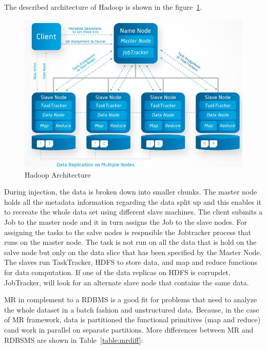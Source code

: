 The described architecture of Hadoop is shown in the \mbox{figure \ref{hdfs_arch}}.

\begin{figure}[!ht]
\centering
\includegraphics[width=15cm]{hdfs_architecture}
\caption{Hadoop Architecture\cite{hdfsFigure}}\label{hdfs_arch}
\end{figure}

During injection, the data is broken down into smaller chunks. The master node holds all the metadata information regarding the data split up and this enables it to recreate the whole data set using different slave machines.\cite{blog} The client submits a Job to the master node and it in turn assigns the Job to the slave nodes. For assigning the tasks to the salve nodes is respnsible the Jobtracker process that runs on the master node. The task is not run on all the data that is hold on the salve node but only on the data slice that has been specified by the Master Node. The slaves run TaskTracker, HDFS to store data, and map and reduce functions for data computation.\cite{rosebt} If one of the data replicas on HDFS is corrupdet, JobTracker, will look for an alternate slave node that contains the same data. 

MR in complement to a RDBMS is a good fit for problems that need to analyze the whole dataset in a batch fashion and unstructured data. Because, in the case of MR framework, data is partitioned the functional primitives (map and reduce) cand work in parallel on separate partitions. More differences between MR and RDBSMS are shown in \mbox {Table \ref{table:mrdiff}}:

